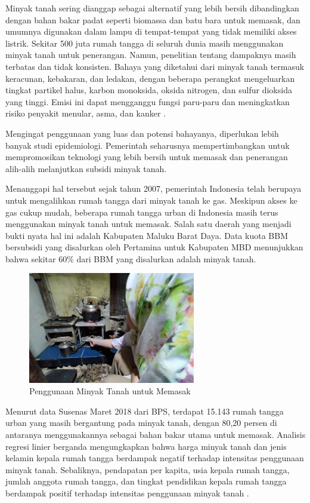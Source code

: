Minyak tanah sering dianggap sebagai alternatif yang lebih bersih dibandingkan dengan bahan bakar padat seperti biomassa dan batu bara untuk memasak, dan umumnya digunakan dalam lampu di tempat-tempat yang tidak memiliki akses listrik. Sekitar 500 juta rumah tangga di seluruh dunia masih menggunakan minyak tanah untuk penerangan. Namun, penelitian tentang dampaknya masih terbatas dan tidak konsisten. Bahaya yang diketahui dari minyak tanah termasuk keracunan, kebakaran, dan ledakan, dengan beberapa perangkat mengeluarkan tingkat partikel halus, karbon monoksida, oksida nitrogen, dan sulfur dioksida yang tinggi. Emisi ini dapat mengganggu fungsi paru-paru dan meningkatkan risiko penyakit menular, asma, dan kanker \citep{Lam_Smith_Gauthier_Bates_2012}.

Mengingat penggunaan yang luas dan potensi bahayanya, diperlukan lebih banyak studi epidemiologi. Pemerintah seharusnya mempertimbangkan untuk mempromosikan teknologi yang lebih bersih untuk memasak dan penerangan alih-alih melanjutkan subsidi minyak tanah.

Menanggapi hal tersebut sejak tahun 2007, pemerintah Indonesia telah berupaya untuk mengalihkan rumah tangga dari minyak tanah ke gas. Meskipun akses ke gas cukup mudah, beberapa rumah tangga urban di Indonesia masih terus menggunakan minyak tanah untuk memasak. Salah satu daerah yang menjadi bukti nyata hal ini adalah Kabupaten Maluku Barat Daya. Data kuota BBM bersubsidi yang disalurkan oleh Pertamina untuk Kabupaten MBD menunjukkan bahwa sekitar 60\% dari BBM yang disalurkan adalah minyak tanah.

\begin{figure}[!ht]
    \centering
    \includegraphics[width=0.65\textwidth]{gambar/masak-minyak-tanah.jpg}
    \caption{Penggunaan Minyak Tanah untuk Memasak \citep{Jumahudin_2021}}
    \label{fig:ilus-masak-minyak-tanah}
\end{figure}

Menurut data Susenas Maret 2018 dari BPS, terdapat 15.143 rumah tangga urban yang masih bergantung pada minyak tanah, dengan 80,20 persen di antaranya menggunakannya sebagai bahan bakar utama untuk memasak. Analisis regresi linier berganda mengungkapkan bahwa harga minyak tanah dan jenis kelamin kepala rumah tangga berdampak negatif terhadap intensitas penggunaan minyak tanah. Sebaliknya, pendapatan per kapita, usia kepala rumah tangga, jumlah anggota rumah tangga, dan tingkat pendidikan kepala rumah tangga berdampak positif terhadap intensitas penggunaan minyak tanah \citep{Soraya_Afiatno_2021}.



